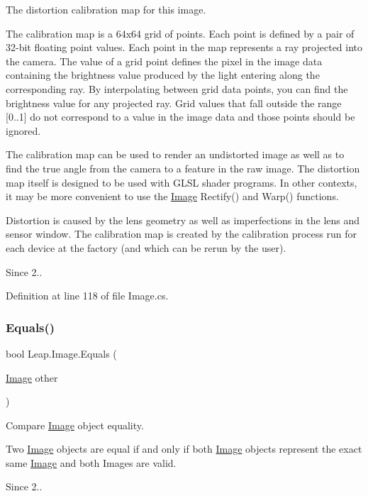 The distortion calibration map for this image. 

The calibration map is a 64x64 grid of points. Each point is defined by a pair of 32-\/bit floating point values. Each point in the map represents a ray projected into the camera. The value of a grid point defines the pixel in the image data containing the brightness value produced by the light entering along the corresponding ray. By interpolating between grid data points, you can find the brightness value for any projected ray. Grid values that fall outside the range \mbox{[}0..1\mbox{]} do not correspond to a value in the image data and those points should be ignored.

The calibration map can be used to render an undistorted image as well as to find the true angle from the camera to a feature in the raw image. The distortion map itself is designed to be used with G\+L\+SL shader programs. In other contexts, it may be more convenient to use the \mbox{\hyperlink{class_leap_1_1_image}{Image}} Rectify() and Warp() functions.

Distortion is caused by the lens geometry as well as imperfections in the lens and sensor window. The calibration map is created by the calibration process run for each device at the factory (and which can be rerun by the user).

\begin{DoxySince}{Since}
2.. 
\end{DoxySince}


Definition at line 118 of file Image.\+cs.

\mbox{\label{class_leap_1_1_image_aa0f9ff65ecf4c3902ba9496fb57d2f81}} 
\subsubsection{\texorpdfstring{Equals()}{Equals()}}
{\footnotesize\ttfamily bool Leap.\+Image.\+Equals (\begin{DoxyParamCaption}\item[{\mbox{\hyperlink{class_leap_1_1_image}{Image}}}]{other }\end{DoxyParamCaption})}



Compare \mbox{\hyperlink{class_leap_1_1_image}{Image}} object equality. 

Two \mbox{\hyperlink{class_leap_1_1_image}{Image}} objects are equal if and only if both \mbox{\hyperlink{class_leap_1_1_image}{Image}} objects represent the exact same \mbox{\hyperlink{class_leap_1_1_image}{Image}} and both Images are valid. \begin{DoxySince}{Since}
2.. 
\end{DoxySince}


